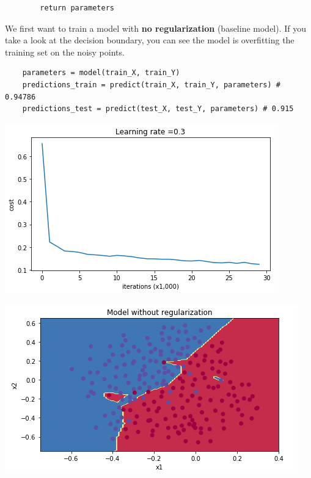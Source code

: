 \documentclass[11pt, a4paper]{article}
\begin{document}
\begin{spacing}{1.1}
\begin{lstlisting}
		return parameters \end{lstlisting} \vspace*{1mm}
	We first want to train a model with \textbf{no regularization} (baseline model). If you take a look at the decision boundary, you can see the model is overfitting the training set on the noisy points.
	\begin{lstlisting}
	parameters = model(train_X, train_Y)
	predictions_train = predict(train_X, train_Y, parameters) # 0.94786
	predictions_test = predict(test_X, test_Y, parameters) # 0.915 \end{lstlisting}
	\begin{minipage}[c]{9cm}
	\begin{center} \includegraphics[scale=.51]{no_reg_cost}	\end{center}
	\end{minipage}
	\begin{minipage}[c]{9cm}
	\begin{center} \includegraphics[scale=.51]{no_reg_bound}	\end{center}
	\end{minipage} \newpage


\end{spacing}
\end{document}
